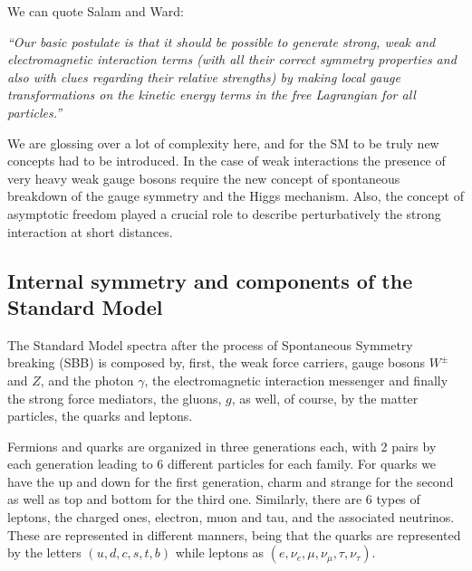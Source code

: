 We can quote Salam and Ward: %

\textit{“Our basic postulate is that it should be possible to generate strong,  weak and electromagnetic  interaction terms (with all their correct symmetry properties and also with clues regarding their relative strengths) by making local gauge transformations on the kinetic energy terms in the free Lagrangian for all particles.”}

We are glossing over a lot of complexity here, and for the SM to be truly new concepts had to be introduced. In the case of weak interactions the presence of very heavy weak gauge bosons require the new concept of spontaneous breakdown of the gauge symmetry and  the Higgs  mechanism. 
%
Also, the concept of asymptotic freedom played a crucial role to describe perturbatively the strong interaction at short distances.  
% 

\subsection{Internal symmetry and components of the Standard Model}

The Standard Model spectra after the process of Spontaneous Symmetry breaking (SBB) is composed by, first, the weak force carriers, gauge bosons $W^\pm$ and $Z$, and the photon $\gamma$, the electromagnetic interaction messenger and finally the strong force mediators, the gluons, $g$, as well, of course, by the matter particles, the quarks and leptons. 

Fermions and quarks are organized in three generations each, with 2 pairs by each generation leading to 6 different particles for each family. For quarks we have the up and down for the first generation, charm and strange for the second as well as top and bottom for the third one. Similarly, there are 6 types of leptons, the charged ones, electron, muon and tau, and the associated neutrinos. These are represented in different manners, being that the quarks are represented by the letters $(u,d,c,s,t,b)$ while leptons as $(e,\nu_{e},\mu,\nu_{\mu},\tau,\nu_{\tau})$. 
%

